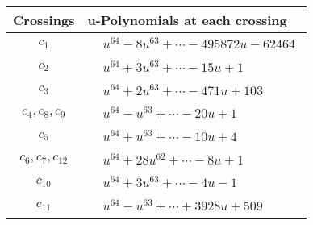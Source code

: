 \documentclass[1p]{elsarticle_modified}
\theoremstyle{definition}
\begin{document}
\begin{tabular}{m{50pt}|m{274pt}}
Crossings & \hspace{64pt}u-Polynomials at each crossing \\
\hline $$\begin{aligned}c_{1}\end{aligned}$$&$\begin{aligned}
&u^{64}-8 u^{63}+\cdots-495872 u-62464
\end{aligned}$\\
\hline $$\begin{aligned}c_{2}\end{aligned}$$&$\begin{aligned}
&u^{64}+3 u^{63}+\cdots-15 u+1
\end{aligned}$\\
\hline $$\begin{aligned}c_{3}\end{aligned}$$&$\begin{aligned}
&u^{64}+2 u^{63}+\cdots-471 u+103
\end{aligned}$\\
\hline $$\begin{aligned}c_{4},c_{8},c_{9}\end{aligned}$$&$\begin{aligned}
&u^{64}- u^{63}+\cdots-20 u+1
\end{aligned}$\\
\hline $$\begin{aligned}c_{5}\end{aligned}$$&$\begin{aligned}
&u^{64}+u^{63}+\cdots-10 u+4
\end{aligned}$\\
\hline $$\begin{aligned}c_{6},c_{7},c_{12}\end{aligned}$$&$\begin{aligned}
&u^{64}+28 u^{62}+\cdots-8 u+1
\end{aligned}$\\
\hline $$\begin{aligned}c_{10}\end{aligned}$$&$\begin{aligned}
&u^{64}+3 u^{63}+\cdots-4 u-1
\end{aligned}$\\
\hline $$\begin{aligned}c_{11}\end{aligned}$$&$\begin{aligned}
&u^{64}- u^{63}+\cdots+3928 u+509
\end{aligned}$\\
\hline
\end{tabular}\\~\\
\end{document}
